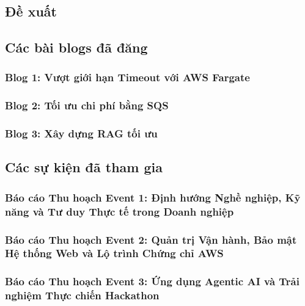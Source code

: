 \newpage

\subsection{Đề xuất}



\newpage

\subsection{Các bài blogs đã đăng}

\subsubsection{Blog 1: Vượt giới hạn Timeout với AWS Fargate}


\subsubsection{Blog 2: Tối ưu chi phí bằng SQS}


\subsubsection{Blog 3: Xây dựng RAG tối ưu}


\newpage

\subsection{Các sự kiện đã tham gia}

\subsubsection{Báo cáo Thu hoạch Event 1: Định hướng Nghề nghiệp, Kỹ năng và Tư duy Thực tế trong Doanh nghiệp}


\subsubsection{Báo cáo Thu hoạch Event 2: Quản trị Vận hành, Bảo mật Hệ thống Web và Lộ trình Chứng chỉ AWS}


\subsubsection{Báo cáo Thu hoạch Event 3: Ứng dụng Agentic AI và Trải nghiệm Thực chiến Hackathon}


